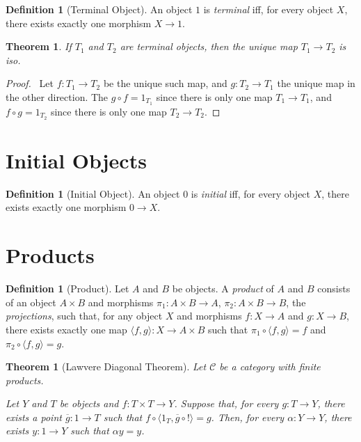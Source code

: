 \documentclass{article}
\let\qed\relax
\newtheorem{thm}[axiom]{Theorem}
\theoremstyle{definition}
\newtheorem{definition}[axiom]{Definition}
\begin{document}
\begin{definition}[Terminal Object]
    An object $1$ is \emph{terminal} iff, for every object $X$, there exists exactly one morphism $X \rightarrow 1$.
\end{definition}

\begin{thm}
    If $T_1$ and $T_2$ are terminal objects, then the unique map $T_1 \rightarrow T_2$ is iso.
\end{thm}

\begin{proof}
    \pf\ Let $f : T_1 \rightarrow T_2$ be the unique such map, and $g : T_2 \rightarrow T_1$ the unique map
    in the other direction. The $g \circ f = 1_{T_1}$ since there is only one map $T_1 \rightarrow T_1$,
    and $f \circ g = 1_{T_2}$ since there is only one map $T_2 \rightarrow T_2$. \qed
\end{proof}

\section{Initial Objects}

\begin{definition}[Initial Object]
    An object $0$ is \emph{initial} iff, for every object $X$, there exists exactly one morphism 
    $0 \rightarrow X$.
\end{definition}

\section{Products}

\begin{definition}[Product]
    Let $A$ and $B$ be objects. A \emph{product} of $A$ and $B$ consists of an object $A \times B$ and
    morphisms $\pi_1 : A \times B \rightarrow A$, $\pi_2 : A \times B \rightarrow B$, the \emph{projections},
    such that, for any object $X$ and morphisms $f : X \rightarrow A$ and $g : X \rightarrow B$, there exists
    exactly one map $\langle f, g \rangle : X \rightarrow A \times B$ such that
    $\pi_1 \circ \langle f,g \rangle = f$ and $\pi_2 \circ \langle f, g \rangle = g$.
\end{definition}

\begin{thm}[Lawvere Diagonal Theorem]
    Let $\mathcal{C}$ be a category with finite products.

    Let $Y$ and $T$ be objects and $f : T \times T \rightarrow Y$. Suppose that, for every $g : T \rightarrow Y$,
    there exists a point $\overline{g} : 1 \rightarrow T$ such that $f \circ \langle 1_T, \overline{g} \circ ! \rangle = g$.
    Then, for every $\alpha : Y \rightarrow Y$, there exists $y : 1 \rightarrow Y$ such that $\alpha y = y$.
\end{thm}
\end{document}
